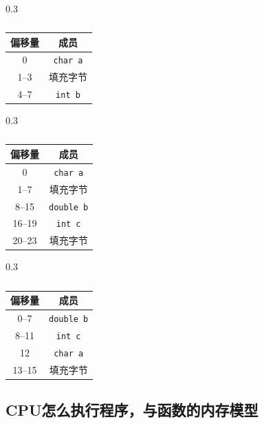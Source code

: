 \begin{table}
    \begin{subtable}[t]{0.3\textwidth}
        \centering
        \begin{tabular}{cc}
            \toprule
            偏移量 & 成员 \\
            \midrule
            0 & \verb|char a| \\
            1--3 & 填充字节 \\
            4--7 & \verb|int b| \\
            \bottomrule
        \end{tabular}
        \caption{}
        \label{tab:struct-offset}
    \end{subtable}
    \hfill
    \begin{subtable}[t]{0.3\textwidth}
        \centering
        \begin{tabular}{cc}
            \toprule
            偏移量 & 成员 \\
            \midrule
            0 & \verb|char a| \\
            1--7 & 填充字节 \\
            8--15 & \verb|double b| \\
            16--19 & \verb|int c| \\
            20--23 & 填充字节 \\
            \bottomrule
        \end{tabular}
        \caption{}
        \label{tab:struct-offset2}
    \end{subtable}
    \hfill
    \begin{subtable}[t]{0.3\textwidth}
        \centering
        \begin{tabular}{cc}
            \toprule
            偏移量 & 成员 \\
            \midrule
            0--7 & \verb|double b| \\
            8--11 & \verb|int c| \\
            12 & \verb|char a| \\
            13--15 & 填充字节 \\
            \bottomrule
        \end{tabular}
        \caption{}
        \label{tab:struct-offset3}
    \end{subtable}
    \caption{}
\end{table}

\subsection{CPU怎么执行程序，与函数的内存模型}

